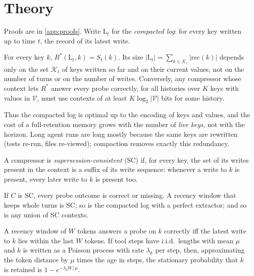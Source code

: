 \section{Theory}
\label{sec:theory}

Proofs are in \cref{app:proofs}. Write $\mathrm{L}_t$ for the \emph{compacted
log}: for every key written up to time $t$, the record of its latest write.

\begin{proposition}
\label{prop:sufficiency}
For every key $k$, $R^\ast(\mathrm{L}_t,k)=S_t(k)$. Its size
$|\mathrm{L}_t| = \sum_{k\in\mathcal{K}_t}|\mathrm{rec}(k)|$ depends only on the
set $\mathcal{K}_t$ of keys written so far and on their current values, not on
the number of turns or on the number of writes.
Conversely, any compressor whose context lets $R^\ast$ answer every probe
correctly, for all histories over $K$ keys with values in $\mathcal{V}$, must use
contexts of at least $K\log_2|\mathcal{V}|$ bits for some history.
\end{proposition}

Thus the compacted log is optimal up to the encoding of keys and values, and the
cost of a full-retention memory grows with the number of \emph{live keys}, not
with the horizon. Long agent runs are long mostly because the same keys are
rewritten (tests re-run, files re-viewed); compaction removes exactly this
redundancy.

\begin{definition}
A compressor is \emph{supersession-consistent} (SC) if, for every key, the set
of its writes present in the context is a suffix of its write sequence: whenever
a write to $k$ is present, every later write to $k$ is present too.
\end{definition}

\begin{proposition}
\label{prop:sc}
If $C$ is SC, every probe outcome is correct or missing. A recency window that
keeps whole turns is SC; so is the compacted log with a perfect extractor; and
so is any union of SC contexts.
\end{proposition}

\begin{proposition}
\label{prop:window}
A recency window of $W$ tokens answers a probe on $k$ correctly iff the latest
write to $k$ lies within the last $W$ tokens. If tool steps have i.i.d.\ lengths
with mean $\mu$ and $k$ is written as a Poisson process with rate $\lambda_k$
per step, then, approximating the token distance by $\mu$ times the age in steps, the
stationary probability that $k$ is retained is $1-e^{-\lambda_k W/\mu}$.
\end{proposition}

